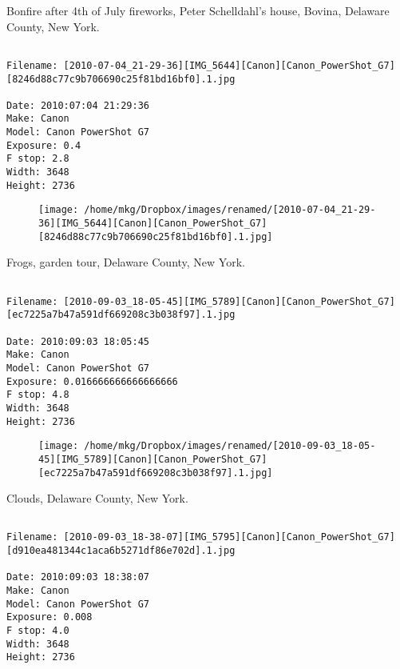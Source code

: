 \clearpage
\onecolumn
\noindent Bonfire after 4th of July fireworks, Peter Schelldahl's house, Bovina, Delaware County, New York.
\noindent
\begin{lstlisting}

Filename: [2010-07-04_21-29-36][IMG_5644][Canon][Canon_PowerShot_G7][8246d88c77c9b706690c25f81bd16bf0].1.jpg

Date: 2010:07:04 21:29:36
Make: Canon
Model: Canon PowerShot G7
Exposure: 0.4
F stop: 2.8
Width: 3648
Height: 2736
\end{lstlisting}
\clearpage

\begin{figure}
\texttt{[image: /home/mkg/Dropbox/images/renamed/[2010-07-04\_21-29-36][IMG\_5644][Canon][Canon\_PowerShot\_G7][8246d88c77c9b706690c25f81bd16bf0].1.jpg]}
\end{figure}
    
\clearpage
\onecolumn
\noindent Frogs, garden tour, Delaware County, New York.
\noindent
\begin{lstlisting}

Filename: [2010-09-03_18-05-45][IMG_5789][Canon][Canon_PowerShot_G7][ec7225a7b47a591df669208c3b038f97].1.jpg

Date: 2010:09:03 18:05:45
Make: Canon
Model: Canon PowerShot G7
Exposure: 0.016666666666666666
F stop: 4.8
Width: 3648
Height: 2736
\end{lstlisting}
\clearpage

\begin{figure}
\texttt{[image: /home/mkg/Dropbox/images/renamed/[2010-09-03\_18-05-45][IMG\_5789][Canon][Canon\_PowerShot\_G7][ec7225a7b47a591df669208c3b038f97].1.jpg]}
\end{figure}
    
\clearpage
\onecolumn
\noindent Clouds, Delaware County, New York.
\noindent
\begin{lstlisting}

Filename: [2010-09-03_18-38-07][IMG_5795][Canon][Canon_PowerShot_G7][d910ea481344c1aca6b5271df86e702d].1.jpg

Date: 2010:09:03 18:38:07
Make: Canon
Model: Canon PowerShot G7
Exposure: 0.008
F stop: 4.0
Width: 3648
Height: 2736
\end{lstlisting}
\clearpage

